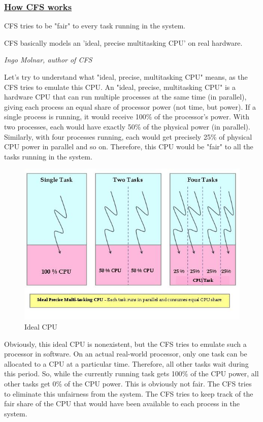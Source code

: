 \documentclass{article}
\begin{document}
\subsubsection{\underline{How CFS works}}

CFS tries to be "fair" to every task running in the system.

\epigraph{CFS basically models an 'ideal, precise multitasking CPU' on real hardware.}{\textit{Ingo Molnar, author of CFS}}

Let's try to understand what "ideal, precise, multitasking CPU" means, as the CFS tries to emulate this CPU. An "ideal, precise, multitasking CPU" is a hardware CPU that can run multiple processes at the same time (in parallel), giving each process an equal share of processor power (not time, but power). If a single process is running, it would receive 100\% of the processor's power. With two processes, each would have exactly 50\% of the physical power (in parallel). Similarly, with four processes running, each would get precisely 25\% of physical CPU power in parallel and so on. Therefore, this CPU would be "fair" to all the tasks running in the system.

\begin{figure}[H]
  \center
  \includegraphics[width=0.7\columnwidth]{./pics/cpu0.jpg}
  \caption{Ideal CPU}
  \label{fig:Ideal CPU}
\end{figure}

Obviously, this ideal CPU is nonexistent, but the CFS tries to emulate such a processor in software. On an actual real-world processor, only one task can be allocated to a CPU at a particular time. Therefore, all other tasks wait during this period. So, while the currently running task gets 100\% of the CPU power, all other tasks get 0\% of the CPU power. This is obviously not fair. The CFS tries to eliminate this unfairness from the system. The CFS tries to keep track of the fair share of the CPU that would have been available to each process in the system.
\end{document}

